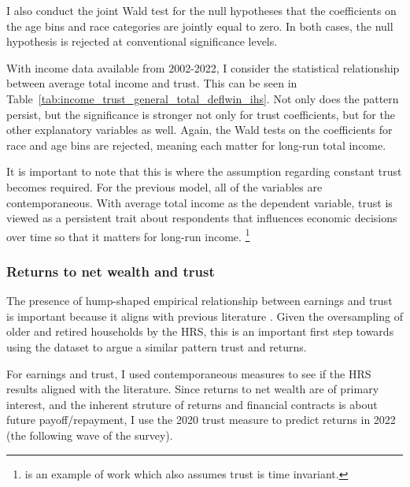 \label{tab:income_trust_general_total_ihs}
\FloatBarrier

\par I also conduct the joint Wald test for the null hypotheses that the coefficients on the age bins and race categories are jointly equal to zero. In both cases, the null hypothesis is rejected at conventional significance levels.

\par With income data available from 2002-2022, I consider the statistical relationship between average total income and trust. This can be seen in Table~\ref{tab:income_trust_general_total_deflwin_ihs}. Not only does the pattern persist, but the significance is stronger not only for trust coefficients, but for the other explanatory variables as well. Again, the Wald tests on the coefficients for race and age bins are rejected, meaning each matter for long-run total income.  

\label{tab:income_trust_general_total_deflwin_ihs}
\FloatBarrier

\par It is important to note that this is where the assumption regarding constant trust becomes required. For the previous model, all of the variables are contemporaneous. With average total income as the dependent variable, trust is viewed as a persistent trait about respondents that influences economic decisions over time so that it matters for long-run income. \footnote{\cite{Lesmeister2019} is an example of work which also assumes trust is time invariant.}

\subsubsection{Returns to net wealth and trust}

\par The presence of hump-shaped empirical relationship between earnings and trust is important because it aligns with previous literature \cite{jbpglg2016}. Given the oversampling of older and retired households by the HRS, this is an important first step towards using the dataset to argue a similar pattern trust and returns.

\par For earnings and trust, I used contemporaneous measures to see if the HRS results aligned with the literature. Since returns to net wealth are of primary interest, and the inherent struture of returns and financial contracts is about future payoff/repayment, I use the 2020 trust measure to predict returns in 2022 (the following wave of the survey).

